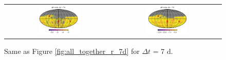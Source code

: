 \documentclass[preprintm,linenumbers]{aastex631}
\begin{document}
\begin{figure}
\begin{tabular}{c c}
         \includegraphics[width=0.4\textwidth]{results/skymaps_cutout/skymaps_cutout_delta_first_year_one_snap_v4_0_10yrs_db_noDD_noTwi_tscale-7_nside-256_doAllTemplateMetrics_reduceCount_g_noDD_noTwi.pdf} &
         \includegraphics[width=0.4\textwidth]{results/skymaps_cutout/skymaps_cutout_delta_first_year_one_snap_v4_0_10yrs_db_noDD_noTwi_tscale-7_nside-256_doAllTemplateMetrics_reduceCount_r_noDD_noTwi.pdf} \\

   \end{tabular}

        \caption{
        Same as Figure \ref{fig:all_together_r_7d} for $\Delta t$ = 7 d. 
        }
        \label{fig:_all_together_r_7d}
	\end{figure}

  
\end{document}
